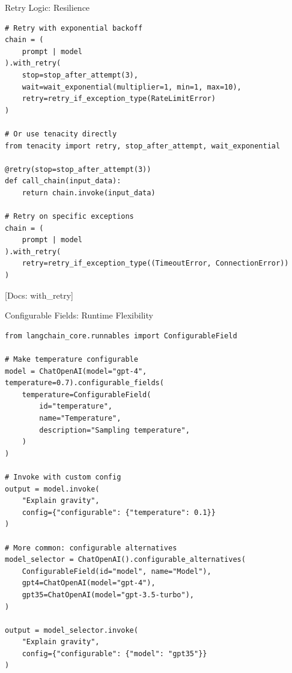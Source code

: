 \documentclass[aspectratio=169,11pt]{beamer}
\newcommand{\docref}[1]{{\scriptsize\color{docgray}[Docs: #1]}}
\begin{document}
\begin{frame}[fragile,shrink=3]{Retry Logic: Resilience}
  \begin{codebox}
\begin{lstlisting}
# Retry with exponential backoff
chain = (
    prompt | model
).with_retry(
    stop=stop_after_attempt(3),
    wait=wait_exponential(multiplier=1, min=1, max=10),
    retry=retry_if_exception_type(RateLimitError)
)

# Or use tenacity directly
from tenacity import retry, stop_after_attempt, wait_exponential

@retry(stop=stop_after_attempt(3))
def call_chain(input_data):
    return chain.invoke(input_data)

# Retry on specific exceptions
chain = (
    prompt | model
).with_retry(
    retry=retry_if_exception_type((TimeoutError, ConnectionError))
)
\end{lstlisting}
  \end{codebox}

  \docref{with\_retry}
\end{frame}

\begin{frame}[fragile,shrink=3]{Configurable Fields: Runtime Flexibility}
  \begin{codebox}
\begin{lstlisting}
from langchain_core.runnables import ConfigurableField

# Make temperature configurable
model = ChatOpenAI(model="gpt-4", temperature=0.7).configurable_fields(
    temperature=ConfigurableField(
        id="temperature",
        name="Temperature",
        description="Sampling temperature",
    )
)

# Invoke with custom config
output = model.invoke(
    "Explain gravity",
    config={"configurable": {"temperature": 0.1}}
)

# More common: configurable alternatives
model_selector = ChatOpenAI().configurable_alternatives(
    ConfigurableField(id="model", name="Model"),
    gpt4=ChatOpenAI(model="gpt-4"),
    gpt35=ChatOpenAI(model="gpt-3.5-turbo"),
)

output = model_selector.invoke(
    "Explain gravity",
    config={"configurable": {"model": "gpt35"}}
)
\end{lstlisting}
  \end{codebox}
\end{frame}
\end{document}
